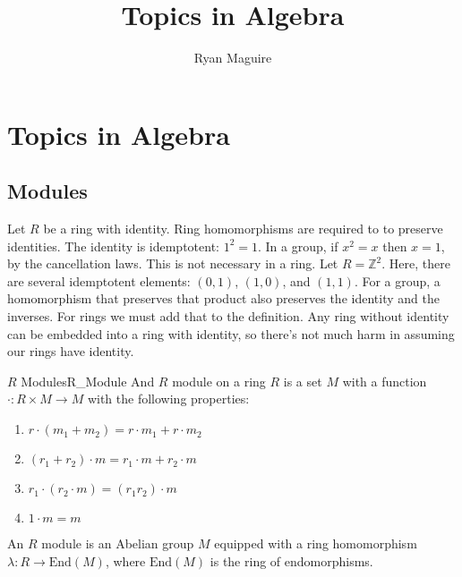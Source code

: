 \documentclass[crop=false,class=book,oneside]{standalone}                  %
\begin{document}
        \title{Topics in Algebra}
        \author{Ryan Maguire}
        \date{\vspace{-5ex}}
        \maketitle
        \tableofcontents
        \clearpage
        \chapter*{Topics in Algebra}
        \vspace{10ex}
        \setcounter{chapter}{1}
    \section{Modules}
        Let $R$ be a ring with identity. Ring homomorphisms are required to
        to preserve identities. The identity is idemptotent:
        $1^{2}=1$. In a group, if $x^{2}=x$ then $x=1$, by the cancellation
        laws. This is not necessary in a ring. Let $R=\mathbb{Z}^{2}$. Here,
        there are several idemptotent elements: $(0,1)$, $(1,0)$, and
        $(1,1)$. For a group, a homomorphism that preserves that product
        also preserves the identity and the inverses. For rings we must
        add that to the definition. Any ring without identity can be
        embedded into a ring with identity, so there's not much harm in
        assuming our rings have identity.
        \begin{ldefinition}{$R$ Modules}{R_Module}
            And $R$ module on a ring $R$ is a set $M$ with a function
            $\cdot:R\times{M}\rightarrow{M}$ with the following properties:
            \begin{enumerate}
                \item $r\cdot(m_{1}+m_{2})=r\cdot{m}_{1}+r\cdot{m}_{2}$
                \item $(r_{1}+r_{2})\cdot{m}=r_{1}\cdot{m}+r_{2}\cdot{m}$
                \item $r_{1}\cdot(r_{2}\cdot{m})=(r_{1}r_{2})\cdot{m}$
                \item $1\cdot{m}=m$
            \end{enumerate}
        \end{ldefinition}
        \begin{theorem}
            An $R$ module is an Abelian group $M$ equipped with a ring
            homomorphism $\lambda:R\rightarrow\textrm{End}(M)$, where
            $\textrm{End}(M)$ is the ring of endomorphisms.
        \end{theorem}
\end{document}
